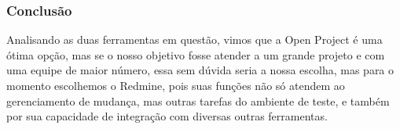 \documentclass[12pt,a4paper]{article}
\begin{document}
		\subsubsection{Conclusão}
		
			Analisando as duas ferramentas em questão, vimos que a Open Project é uma ótima opção, mas se o nosso objetivo fosse atender a um grande projeto e com uma equipe de maior número, essa sem dúvida seria a nossa escolha, mas para o momento escolhemos o Redmine, pois suas funções não só atendem ao gerenciamento de mudança, mas outras tarefas do ambiente de teste, e também por sua capacidade de integração com diversas outras ferramentas.
		

\clearpage
\nocite{*}
		
		
\end{document}
